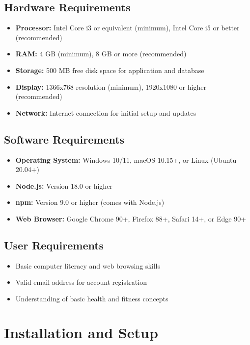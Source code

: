 \subsection{Hardware Requirements}
\begin{itemize}
    \item \textbf{Processor:} Intel Core i3 or equivalent (minimum), Intel Core i5 or better (recommended)
    \item \textbf{RAM:} 4 GB (minimum), 8 GB or more (recommended)
    \item \textbf{Storage:} 500 MB free disk space for application and database
    \item \textbf{Display:} 1366x768 resolution (minimum), 1920x1080 or higher (recommended)
    \item \textbf{Network:} Internet connection for initial setup and updates
\end{itemize}

\subsection{Software Requirements}
\begin{itemize}
    \item \textbf{Operating System:} Windows 10/11, macOS 10.15+, or Linux (Ubuntu 20.04+)
    \item \textbf{Node.js:} Version 18.0 or higher
    \item \textbf{npm:} Version 9.0 or higher (comes with Node.js)
    \item \textbf{Web Browser:} Google Chrome 90+, Firefox 88+, Safari 14+, or Edge 90+
\end{itemize}

\subsection{User Requirements}
\begin{itemize}
    \item Basic computer literacy and web browsing skills
    \item Valid email address for account registration
    \item Understanding of basic health and fitness concepts
\end{itemize}

\section{Installation and Setup}

